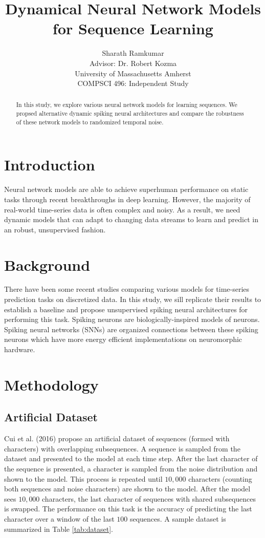 \documentclass{article}
\title{Dynamical Neural Network Models\\for Sequence Learning}
\author{Sharath Ramkumar\\
Advisor: Dr. Robert Kozma\\University of Massachusetts Amherst\\COMPSCI 496: Independent Study}
\date{}
\begin{document}
\maketitle

\begin{abstract}
In this study, we explore various neural network models for learning sequences. We propsed alternative dynamic spiking neural architectures and compare the robustness of these network models to randomized temporal noise.
\end{abstract}


\section*{Introduction}

Neural network models are able to achieve superhuman performance on static tasks through recent breakthroughs in deep learning. However, the majority of real-world time-series data is often complex and noisy. As a result, we need dynamic models that can adapt to changing data streams to learn and predict in an robust, unsupervised fashion. 

\section*{Background}
There have been some recent studies comparing various models for time-series prediction tasks \cite{cui2016continuous} on discretized data. In this study, we sill replicate their results to establish a baseline and propose unsupervised spiking neural architectures for performing this task. Spiking neurons \cite{gerstner2002spiking} are biologically-inspired models of neurons. Spiking neural networks (SNNs) \cite{maass1997networks} are organized connections between these spiking neurons which have more energy efficient \cite{cruz2012energy} implementations on neuromorphic hardware.

\section*{Methodology}

\subsection*{Artificial Dataset}

Cui et al. (2016) propose an artificial dataset of sequences (formed with characters) with overlapping subsequences. A sequence is sampled from the dataset and presented to the model at each time step. After the last character of the sequence is presented, a character is sampled from the noise distribution and shown to the model. This process is repeated until $10,000$ characters (counting both sequences and noise characters) are shown to the model. After the model sees $10,000$ characters, the last character of sequences with shared subsequences is swapped. The performance on this task is the accuracy of predicting the last character over a window of the last $100$ sequences. A sample dataset is summarized in Table \ref{tab:dataset}.
\end{document}
